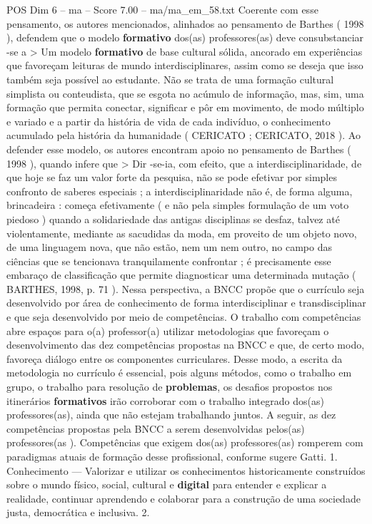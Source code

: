 \begin{textsample}{POS Dim 6 – ma – Score 7.00 – ma/ma\_em\_58.txt}
Coerente com esse pensamento, os autores mencionados, alinhados ao pensamento de Barthes ( 1998 ), defendem que o modelo \textbf{formativo} dos(as) professores(as) deve consubstanciar -se a > Um modelo \textbf{formativo} de base cultural sólida, ancorado em experiências que favoreçam leituras de mundo interdisciplinares, assim como se deseja que isso também seja possível ao estudante.
Não se trata de uma formação cultural simplista ou conteudista, que se esgota no acúmulo de informação, mas, sim, uma formação que permita conectar, significar e pôr em movimento, de modo múltiplo e variado e a partir da história de vida de cada indivíduo, o conhecimento acumulado pela história da humanidade ( CERICATO ; CERICATO, 2018 ).
Ao defender esse modelo, os autores encontram apoio no pensamento de Barthes ( 1998 ), quando infere que > Dir -se-ia, com efeito, que a interdisciplinaridade, de que hoje se faz um valor forte da pesquisa, não se pode efetivar por simples confronto de saberes especiais ; a interdisciplinaridade não é, de forma alguma, brincadeira : começa efetivamente ( e não pela simples formulação de um voto piedoso ) quando a solidariedade das antigas disciplinas se desfaz, talvez até violentamente, mediante as sacudidas da moda, em proveito de um objeto novo, de uma linguagem nova, que não estão, nem um nem outro, no campo das ciências que se tencionava tranquilamente confrontar ; é precisamente esse embaraço de classificação que permite diagnosticar uma determinada mutação ( BARTHES, 1998, p. 71 ).
Nessa perspectiva, a BNCC propõe que o currículo seja desenvolvido por área de conhecimento de forma interdisciplinar e transdisciplinar e que seja desenvolvido por meio de competências.
O trabalho com competências abre espaços para o(a) professor(a) utilizar metodologias que favoreçam o desenvolvimento das dez competências propostas na BNCC e que, de certo modo, favoreça diálogo entre os componentes curriculares.
Desse modo, a escrita da metodologia no currículo é essencial, pois alguns métodos, como o trabalho em grupo, o trabalho para resolução de \textbf{problemas}, os desafios propostos nos itinerários \textbf{formativos} irão corroborar com o trabalho integrado dos(as) professores(as), ainda que não estejam trabalhando juntos.
A seguir, as dez competências propostas pela BNCC a serem desenvolvidas pelos(as) professores(as ).
Competências que exigem dos(as) professores(as) romperem com paradigmas atuais de formação desse profissional, conforme sugere Gatti. 1.
Conhecimento — Valorizar e utilizar os conhecimentos historicamente construídos sobre o mundo físico, social, cultural e \textbf{digital} para entender e explicar a realidade, continuar aprendendo e colaborar para a construção de uma sociedade justa, democrática e inclusiva. 2.

\end{textsample}
